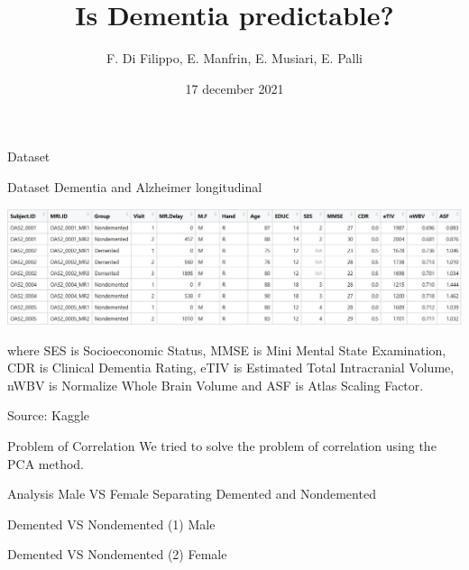 \documentclass{beamer}
\title{Is Dementia predictable?}
\author{F. Di Filippo, E. Manfrin, E. Musiari, E. Palli}
\date{17 december 2021}
\begin{document}
\begin{frame}
\maketitle
\end{frame}


\begin{frame}{Dataset}

Dataset Dementia and Alzheimer longitudinal
\begin{center}
	
	
	\includegraphics[width=\columnwidth]{dataset_al.jpeg}
\end{center}


where SES is Socioeconomic Status, MMSE is Mini Mental State Examination, CDR is Clinical Dementia Rating, eTIV is Estimated Total Intracranial Volume, nWBV is Normalize Whole Brain Volume and ASF is Atlas Scaling Factor.

\vspace{0.1 cm}
Source: Kaggle


\end{frame}

\begin{frame}{Problem of Correlation}
We tried to solve the problem of correlation using the PCA method.

\end{frame}

\begin{frame}{Analysis Male VS Female}
Separating Demented and Nondemented
	
\end{frame}


\begin{frame}{Demented VS Nondemented (1)}
Male

\end{frame}

\begin{frame}{Demented VS Nondemented (2)}
Female

\end{frame}
\end{document}
